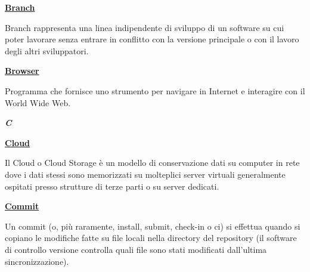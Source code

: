 \bigskip

\begin{addmargin}[0em]{0em}
	\textbf{\underline{Branch}} 
\end{addmargin}
	
\medskip
\begin{addmargin}[5em]{1em}
Branch rappresenta una linea indipendente di sviluppo di un software su cui poter lavorare 
senza entrare in conflitto con la versione principale o con il lavoro degli altri sviluppatori.
\end{addmargin}

\bigskip
\begin{addmargin}[0em]{0em}	
	\textbf{\underline{Browser}}
\end{addmargin}
	
\medskip
\begin{addmargin}[5em]{1em}	
Programma che fornisce uno strumento per navigare in Internet e interagire con il World Wide Web.
\end{addmargin}

\newpage

\cleardoublepage
{}
{}
\noindent\hrulefill\hspace{4mm}\textbf{\textsl{\Huge{C}}}\hspace{4mm}\hrulefill

\vspace*{2\bigskipamount}

\begin{addmargin}[0em]{0em}
	\textbf{\underline{Cloud}}
\end{addmargin}
	
\medskip
	\begin{addmargin}[5em]{1em}
Il Cloud o Cloud Storage è un modello di conservazione dati su computer in rete dove i dati stessi sono memorizzati su molteplici server virtuali generalmente ospitati presso strutture di terze parti o su server dedicati.	
\end{addmargin}	

\bigskip
\begin{addmargin}[0em]{0em}	
	\textbf{\underline{Commit}}
\end{addmargin}

\medskip
\begin{addmargin}[5em]{1em}	
Un commit (o, più raramente, install, submit, check-in o ci) si effettua quando si copiano le modifiche fatte su file locali nella directory del repository (il software di controllo versione controlla quali file sono stati modificati dall'ultima sincronizzazione).
\end{addmargin}

